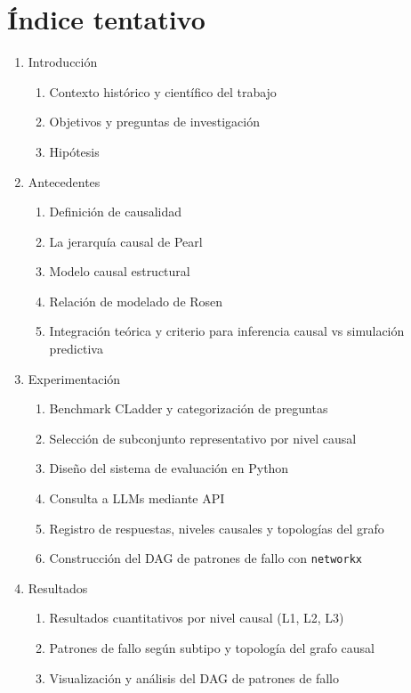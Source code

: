 \documentclass{article}
\begin{document}
\section{Índice tentativo}
\begin{enumerate}
  \item Introducción
  \begin{enumerate}
    \item Contexto histórico y científico del trabajo
    \item Objetivos y preguntas de investigación
    \item Hipótesis
  \end{enumerate}
  \item Antecedentes 
  \begin{enumerate}
    \item Definición de causalidad
    \item La jerarquía causal de Pearl
    \item Modelo causal estructural 
    \item Relación de modelado de Rosen
    \item Integración teórica y criterio para inferencia causal vs simulación predictiva
  \end{enumerate}
  \item Experimentación
  \begin{enumerate}
    \item Benchmark CLadder y categorización de preguntas
    \item Selección de subconjunto representativo por nivel causal
    \item Diseño del sistema de evaluación en Python
    \item Consulta a LLMs mediante API
    \item Registro de respuestas, niveles causales y topologías del grafo
    \item Construcción del DAG de patrones de fallo con \texttt{networkx}
  \end{enumerate}
  \item Resultados
  \begin{enumerate}
    \item Resultados cuantitativos por nivel causal (L1, L2, L3)
    \item Patrones de fallo según subtipo y topología del grafo causal
    \item Visualización y análisis del DAG de patrones de fallo
  \end{enumerate}

\end{enumerate}
\end{document}
